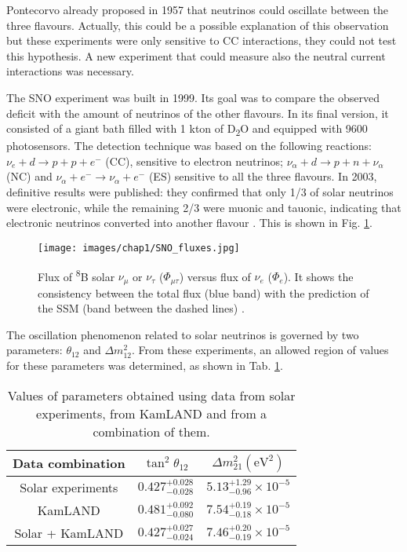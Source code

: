 Pontecorvo already proposed in 1957 that neutrinos could oscillate between the three flavours. Actually, this could be a possible explanation of this observation but these experiments were only sensitive to CC interactions, they could not test this hypothesis. A new experiment that could measure also the neutral current interactions was necessary.

The SNO experiment was built in 1999. Its goal was to compare the observed deficit with the amount of neutrinos of the other flavours. In its final version, it consisted of a giant bath filled with 1 kton of D\textsubscript{2}O and equipped with 9600 photosensors. The detection technique was based on the following reactions: $\nu_e + d \rightarrow p + p + e^-$ (CC), sensitive to electron neutrinos; $\nu_\alpha + d \rightarrow p + n + \nu_\alpha$ (NC) and $\nu_\alpha + e^- \rightarrow \nu_\alpha + e^-$ (ES) sensitive to all the three flavours.
In 2003, definitive results were published: they confirmed that only 1/3 of solar neutrinos were electronic, while the remaining 2/3 were muonic and tauonic, indicating that electronic neutrinos converted into another flavour \cite{SNO_flux}. This is shown in Fig. \ref{fig:SNO-fluxes}.

\begin{figure}
    \centering
    \texttt{[image: images/chap1/SNO\_fluxes.jpg]}
    \caption{Flux of \textsuperscript{8}B solar $\nu_\mu$ or $\nu_\tau$ ($\Phi_{\mu\tau}$) versus flux of $\nu_e$ ($\Phi_e$). It shows the consistency between the total flux (blue band) with the prediction of the SSM (band between the dashed lines) \cite{SNO_flux}.}
    \label{fig:SNO-fluxes}
\end{figure}

The oscillation phenomenon related to solar neutrinos is governed by two parameters: $\theta_{12}$ and $\Delta m^2_{12}$. From these experiments, an allowed region of values for these parameters was determined, as shown in Tab. \ref{tab:solar-reactor-pars}.

\begin{table}[ht]
    \centering
    \begin{tabular}{c|c|c}
        Data combination & $\tan^2\theta_{12}$ & $\Delta m^2_{21} (\text{eV}^2)$ \\
        \hline
        Solar experiments \cite{SNO_flux} & $0.427^{+0.028}_{-0.028}$ & $5.13^{+1.29}_{-0.96} \times 10^{-5}$ \\
        KamLAND \cite{KamLAND} & $0.481^{+0.092}_{-0.080}$ & $7.54^{+0.19}_{-0.18} \times 10^{-5}$ \\
        Solar + KamLAND \cite{solar_reactor_combined_analysis} & $0.427^{+0.027}_{-0.024}$ & $7.46^{+0.20}_{-0.19} \times 10^{-5}$ \\
    \end{tabular}
    \caption{Values of parameters obtained using data from solar experiments, from KamLAND and from a combination of them.}
    \label{tab:solar-reactor-pars}
\end{table}

